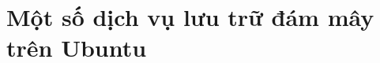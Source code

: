 \documentclass[13pt,a4paper]{extreport}
\begin{document}
%
\newpage



\tableofcontents

\newpage
\listoffigures
 

\newpage
{}
\setcounter{page}{1}
\part{Một số dịch vụ lưu trữ đám mây trên Ubuntu}

\end{document}

